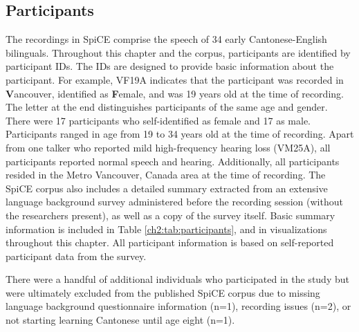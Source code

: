 \subsection{Participants}\label{ch2:subsec:participants} 
The recordings in SpiCE comprise the speech of 34 early Cantonese-English bilinguals. Throughout this chapter and the corpus, participants are identified by participant IDs. The IDs are designed to provide basic information about the participant. For example, VF19A indicates that the participant was recorded in \textbf{V}ancouver, identified as \textbf{F}emale, and was 19 years old at the time of recording. The letter at the end distinguishes participants of the same age and gender. There were 17 participants who self-identified as female and 17 as male. Participants ranged in age from 19 to 34 years old at the time of recording. Apart from one talker who reported mild high-frequency hearing loss (VM25A), all participants reported normal speech and hearing. Additionally, all participants resided in the Metro Vancouver, Canada area at the time of recording. The SpiCE corpus also includes a detailed summary extracted from an extensive language background survey administered before the recording session (without the researchers present), as well as a copy of the survey itself. Basic summary information is included in Table \ref{ch2:tab:participants}, and in visualizations throughout this chapter. All participant information is based on self-reported participant data from the survey.

There were a handful of additional individuals who participated in the study but were ultimately excluded from the published SpiCE corpus due to missing language background questionnaire information (n=1), recording issues (n=2), or not starting learning Cantonese until age eight (n=1).

